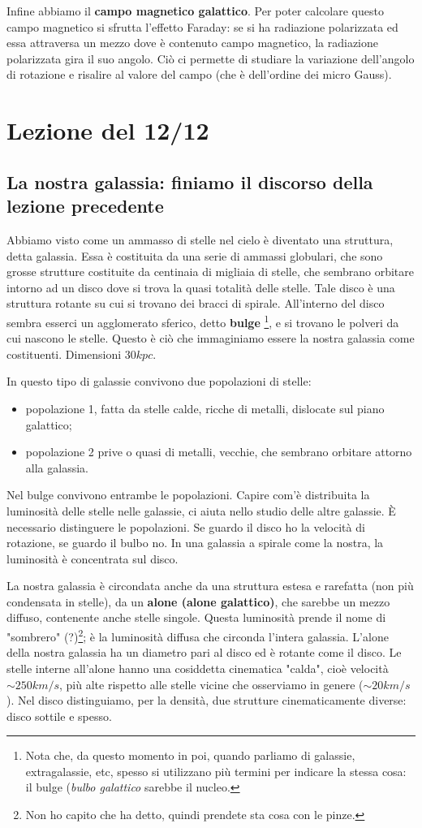 \documentclass[a4paper,11pt]{article}
\begin{document}
Infine abbiamo il \textbf{campo magnetico galattico}. Per poter calcolare questo campo magnetico si sfrutta l'effetto Faraday: se si ha radiazione polarizzata ed essa attraversa un mezzo dove è contenuto campo magnetico, la radiazione polarizzata gira il suo angolo. Ciò ci permette di studiare la variazione dell'angolo di rotazione e risalire al valore del campo (che è dell'ordine dei micro Gauss).

\newpage
\section{Lezione del 12/12}
\subsection{La nostra galassia: finiamo il discorso della lezione precedente}
Abbiamo visto come un ammasso di stelle nel cielo è diventato una struttura, detta galassia. Essa è costituita da una serie di ammassi globulari, che sono grosse strutture costituite da centinaia di migliaia di stelle, che sembrano orbitare intorno ad un disco dove si trova la quasi totalità delle stelle. Tale disco è una struttura rotante su cui si trovano dei bracci di spirale. All'interno del disco sembra esserci un agglomerato sferico, detto \textbf{bulge} \footnote{Nota che, da questo momento in poi, quando parliamo di galassie, extragalassie, etc, spesso si utilizzano più termini per indicare la stessa cosa: il bulge (\textit{bulbo galattico} sarebbe il nucleo.}, e si trovano le polveri da cui nascono le stelle.
Questo è ciò che immaginiamo essere la nostra galassia come costituenti.
Dimensioni $30kpc$.

In questo tipo di galassie convivono due popolazioni di stelle:
\begin{itemize}
    \item popolazione 1, fatta da stelle calde, ricche di metalli, dislocate sul piano galattico;
    \item popolazione 2 prive o quasi di metalli, vecchie, che sembrano orbitare attorno alla galassia.
\end{itemize}
  Nel bulge convivono entrambe le popolazioni. Capire com'è distribuita la luminosità delle stelle nelle galassie, ci aiuta nello studio delle altre galassie. È necessario distinguere le popolazioni. Se guardo il disco ho la velocità di rotazione, se guardo il bulbo no. In una galassia a spirale come la nostra, la luminosità è concentrata sul disco. 

La nostra galassia è circondata anche da una struttura estesa e rarefatta (non più condensata in stelle), da un \textbf{alone (alone galattico)}, che sarebbe un mezzo diffuso, contenente anche stelle singole. Questa luminosità prende il nome di "sombrero" (?)\footnote{Non ho capito che ha detto, quindi prendete sta cosa con le pinze.}; è la luminosità diffusa che circonda l'intera galassia. L'alone della nostra galassia ha un diametro pari al disco ed è rotante come il disco. Le stelle interne all'alone hanno una cosiddetta cinematica "calda", cioè velocità $\sim250 km/s$, più alte rispetto alle stelle vicine che osserviamo in genere ($\sim20 km/s$). Nel disco distinguiamo, per la densità, due strutture cinematicamente diverse: disco sottile e spesso.
\end{document}
